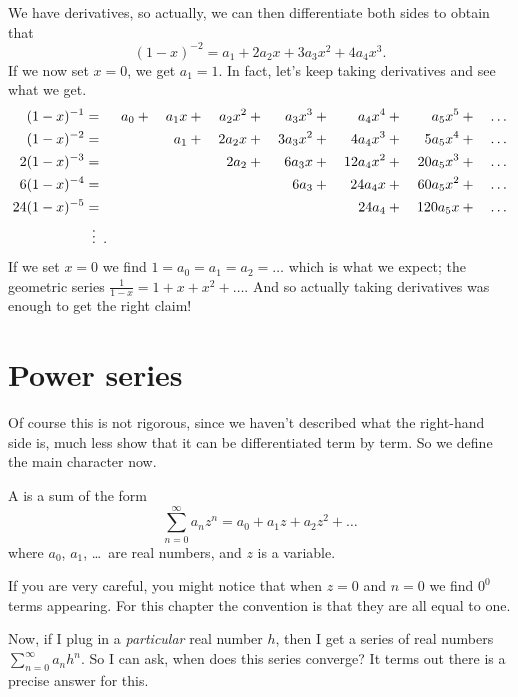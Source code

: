 We have derivatives, so actually,
we can then differentiate both sides to obtain that
\[ (1-x)^{-2} = a_1 + 2a_2 x + 3a_3 x^2 + 4a_4 x^3. \]
If we now set $x = 0$, we get $a_1 = 1$.
In fact, let's keep taking derivatives and see what we get.
\begin{alignat*}{8}
	(1-x)^{-1} &{}={}& a_0 &{}+{}& a_1x &{}+{}& a_2x^2 &{}+{}& a_3x^3 &{}+{}& a_4x^4  &{}+{}& a_5x^5 &{}+{}& \dots \\
	(1-x)^{-2} &{}={}& && a_1 &{}+{}& 2a_2 x &{}+{}& 3a_3 x^2 &{}+{}& 4a_4 x^3 &{}+{}& 5a_5 x^4 &{}+{}&\dots \\
	2(1-x)^{-3} &{}={}& && && 2a_2 &{}+{}& 6a_3 x &{}+{}& 12 a_4 x^2 &{}+{}& 20 a_5 x^3 &{}+{}&  \dots \\
	6(1-x)^{-4} &{}={}& &&  &&&& 6a_3 &{}+{}& 24 a_4 x &{}+{}& 60 a_5 x^2 &{}+{}& \dots \\
	24(1-x)^{-5} &{}={}& && && && && 24 a_4 &{}+{}& 120 a_5 x &{}+{}& \dots \\
	&{}\vdotswithin={}.
\end{alignat*}
If we set $x=0$ we find $1 = a_0 = a_1 = a_2 = \dots$
which is what we expect;
the geometric series $\frac{1}{1-x} = 1 + x + x^2 + \dots$.
And so actually taking derivatives was enough to get the right claim!

\section{Power series}
Of course this is not rigorous,
since we haven't described what the right-hand side is,
much less show that it can be differentiated term by term.
So we define the main character now.

\begin{definition}
	A  is a sum of the form
	\[ \sum_{n = 0}^\infty a_n z^n
		= a_0 + a_1 z + a_2 z^2 + \dots \]
	where $a_0$, $a_1$, \dots\ are real numbers,
	and $z$ is a variable.
\end{definition}
\begin{abuse}
	[$0^0=1$]
	If you are very careful, you might notice
	that when $z=0$ and $n=0$ we find $0^0$ terms appearing.
	For this chapter the convention is that
	they are all equal to one.
\end{abuse}

Now, if I plug in a \emph{particular} real number $h$,
then I get a series of real numbers $\sum_{n = 0}^{\infty} a_n h^n$.
So I can ask, when does this series converge?
It terms out there is a precise answer for this.

